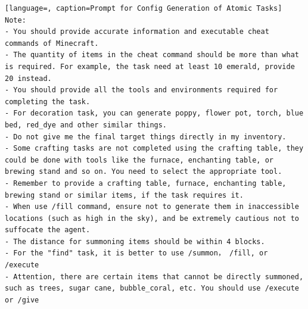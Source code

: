 \begin{lstlisting}[language=, caption=Prompt for Config Generation of Atomic Tasks]
Note: 
- You should provide accurate information and executable cheat commands of Minecraft.
- The quantity of items in the cheat command should be more than what is required. For example, the task need at least 10 emerald, provide 20 instead. 
- You should provide all the tools and environments required for completing the task. 
- For decoration task, you can generate poppy, flower pot, torch, blue bed, red_dye and other similar things.
- Do not give me the final target things directly in my inventory.
- Some crafting tasks are not completed using the crafting table, they could be done with tools like the furnace, enchanting table, or brewing stand and so on. You need to select the appropriate tool.
- Remember to provide a crafting table, furnace, enchanting table, brewing stand or similar items, if the task requires it.
- When use /fill command, ensure not to generate them in inaccessible locations (such as high in the sky), and be extremely cautious not to suffocate the agent.
- The distance for summoning items should be within 4 blocks.
- For the "find" task, it is better to use /summon， /fill, or /execute
- Attention, there are certain items that cannot be directly summoned, such as trees, sugar cane, bubble_coral, etc. You should use /execute  or /give
\end{lstlisting}



